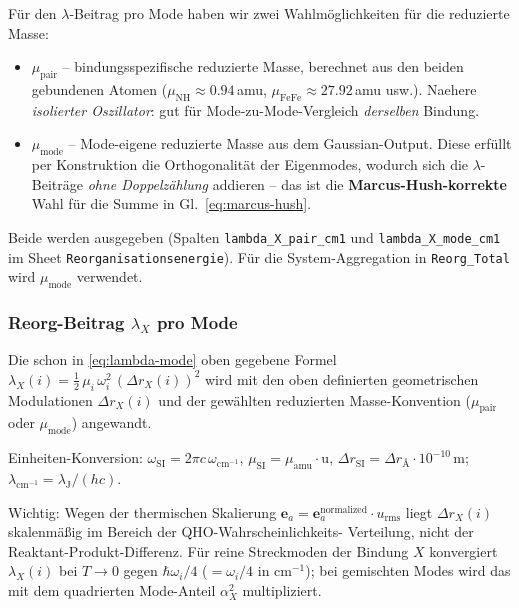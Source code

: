\documentclass[11pt,a4paper,twoside]{article}
\theoremstyle{remark}
\begin{document}
F\"ur den $\lambda$-Beitrag pro Mode haben wir zwei Wahlm\"oglichkeiten
f\"ur die reduzierte Masse:

\begin{itemize}
  \item $\mu_\text{pair}$ -- bindungsspezifische reduzierte Masse,
        berechnet aus den beiden gebundenen Atomen
        ($\mu_\text{NH} \approx 0.94$\,amu,
        $\mu_\text{FeFe} \approx 27.92$\,amu usw.). Naehere
        \emph{isolierter Oszillator}: gut f\"ur Mode-zu-Mode-Vergleich
        \emph{derselben} Bindung.

  \item $\mu_\text{mode}$ -- Mode-eigene reduzierte Masse aus dem
        Gaussian-Output. Diese erf\"ullt per Konstruktion die
        Orthogonalit\"at der Eigenmodes, wodurch sich die
        $\lambda$-Beitr\"age \emph{ohne Doppelz\"ahlung}
        addieren -- das ist die \textbf{Marcus-Hush-korrekte} Wahl
        f\"ur die Summe in Gl.~\ref{eq:marcus-hush}.
\end{itemize}

Beide werden ausgegeben (Spalten \texttt{lambda\_X\_pair\_cm1}
und \texttt{lambda\_X\_mode\_cm1} im Sheet
\texttt{Reorganisationsenergie}). F\"ur die System-Aggregation in
\texttt{Reorg\_Total} wird $\mu_\text{mode}$ verwendet.

\subsubsection*{Reorg-Beitrag $\lambda_X$ pro Mode}

Die schon in \eqref{eq:lambda-mode} oben gegebene Formel
$\lambda_X(i) = \tfrac{1}{2}\,\mu_i\,\omega_i^2\,(\Delta r_X(i))^2$
wird mit den oben definierten geometrischen Modulationen
$\Delta r_X(i)$ und der gew\"ahlten reduzierten Masse-Konvention
($\mu_\text{pair}$ oder $\mu_\text{mode}$) angewandt.

Einheiten-Konversion: $\omega_\text{SI} = 2\pi c\,\omega_{\text{cm}^{-1}}$,
$\mu_\text{SI} = \mu_{\text{amu}} \cdot \text{u}$,
$\Delta r_\text{SI} = \Delta r_{\text{\AA}} \cdot 10^{-10}$\,m;
$\lambda_{\text{cm}^{-1}} = \lambda_\text{J} / (h c)$.

Wichtig: Wegen der thermischen Skalierung
$\mathbf{e}_a = \mathbf{e}_a^\text{normalized} \cdot u_\text{rms}$
liegt $\Delta r_X(i)$ skalenm\"a{\ss}ig im Bereich der QHO-Wahrscheinlichkeits-
Verteilung, nicht der Reaktant-Produkt-Differenz. F\"ur reine
Streckmoden der Bindung $X$ konvergiert $\lambda_X(i)$ bei $T \to 0$
gegen $\hbar\omega_i/4$ ($= \omega_i/4$ in cm$^{-1}$); bei gemischten
Modes wird das mit dem quadrierten Mode-Anteil $\alpha_X^2$ multipliziert.
\end{document}
